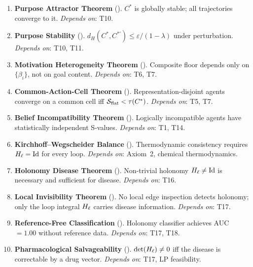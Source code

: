 \begin{enumerate}[label=\textbf{T\arabic*.}, leftmargin=3em, itemsep=0.5em]
  \item \textbf{Purpose Attractor Theorem} ().
    $C^*$ is globally stable; all trajectories converge to it.
    \textit{Depends on}: T10.

  \item \textbf{Purpose Stability} ().
    $d_H(C^*, C^{*'}) \leq \varepsilon/(1-\lambda)$ under perturbation.
    \textit{Depends on}: T10, T11.

  \item \textbf{Motivation Heterogeneity Theorem} ().
    Composite floor depends only on $\{\beta_i\}$, not on goal content.
    \textit{Depends on}: T6, T7.

  \item \textbf{Common-Action-Cell Theorem} ().
    Representation-disjoint agents converge on a common cell iff
    $\mathcal{S}_{\mathrm{flat}} < \tau(C^*)$.
    \textit{Depends on}: T5, T7.

  \item \textbf{Belief Incompatibility Theorem} ().
    Logically incompatible agents have statistically independent S-values.
    \textit{Depends on}: T1, T14.

  \item \textbf{Kirchhoff--Wegscheider Balance} ().
    Thermodynamic consistency requires $H_\ell = \mathrm{Id}$ for every loop.
    \textit{Depends on}: Axiom~2, chemical thermodynamics.

  \item \textbf{Holonomy Disease Theorem} ().
    Non-trivial holonomy $H_\ell \neq \mathrm{Id}$ is necessary and sufficient
    for disease.
    \textit{Depends on}: T16.

  \item \textbf{Local Invisibility Theorem} ().
    No local edge inspection detects holonomy; only the loop integral $H_\ell$
    carries disease information.
    \textit{Depends on}: T17.

  \item \textbf{Reference-Free Classification} ().
    Holonomy classifier achieves AUC $= 1.00$ without reference data.
    \textit{Depends on}: T17, T18.

  \item \textbf{Pharmacological Salvageability} ().
    $\det(H_\ell) \neq 0$ iff the disease is correctable by a drug vector.
    \textit{Depends on}: T17, LP feasibility.


\end{enumerate}
